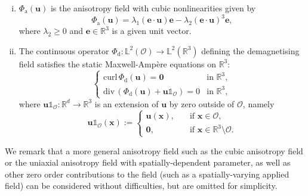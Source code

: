 \documentclass[11pt, reqno]{amsart}
\theoremstyle{definition}
\numberwithin{equation}{section}
\newcommand{\bff}{\boldsymbol}
\newcommand{\bb}{\mathbb}
\begin{document}
\begin{enumerate}[(i)]
	\item $\Phi_{\mathrm{a}}(\bff{u})$ is the anisotropy field with cubic nonlinearities given by
	\begin{equation}\label{equ:aniso}
		\Phi_{\mathrm{a}}(\bff{u})=\lambda_1 (\bff{e}\cdot \bff{u})\bff{e} - \lambda_2 (\bff{e}\cdot \bff{u})^3 \bff{e},
	\end{equation}
	where $\lambda_2\geq 0$ and $\bff{e}\in \bb{R}^3$ is a given unit vector.
	\item The continuous operator $\Phi_{\mathrm{d}}: \bb{L}^2(\mathscr{O})\to \bb{L}^2(\bb{R}^3)$ defining the demagnetising field satisfies the static Maxwell-Amp\`ere equations on $\bb{R}^3$:
	\begin{equation}\label{equ:demag}
		\begin{cases}
			\mathrm{curl}\, \Phi_{\mathrm{d}}(\bff{u}) = \bff{0}
			&\text{in } \bb{R}^3,
			\\
			\mathrm{div}\, (\Phi_{\mathrm{d}}(\bff{u})+ \bff{u} \mathds{1}_{\mathscr{O}})= 0
			&\text{in } \bb{R}^3,
		\end{cases}
	\end{equation}
	where $\bff{u}\mathds{1}_{\mathscr{O}}:\bb{R}^d \to \bb{R}^3$ is an extension of $\bff{u}$ by zero outside of $\mathscr{O}$, namely
	\[
	\bff{u}\mathds{1}_{\mathscr{O}}(\bff{x}):=
	\begin{cases}
		\bff{u}(\bff{x}), \quad &\text{if } \bff{x}\in \mathscr{O},
		\\
		\bff{0}, \quad &\text{if } \bff{x}\in \bb{R}^3\setminus \mathscr{O}.
	\end{cases}
	\]
\end{enumerate}
We remark that a more general anisotropy field such as the cubic anisotropy field or the uniaxial anisotropy field with spatially-dependent parameter, as well as other zero order contributions to the field (such as a spatially-varying applied field) can be considered without difficulties, but are  omitted for simplicity.
\end{document}
